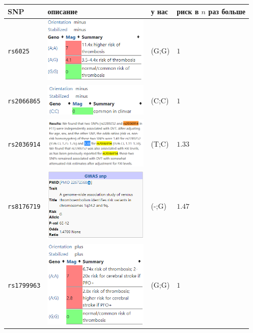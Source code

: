 \documentclass{article}
\begin{document}
  \begin{center}
    \begin{tabular}{|l|l|l|l|}
      \hline
      \textbf{SNP} & \textbf{описание} & \textbf{у нас} & \textbf{риск в $n$ раз больше} \\
      \hline\hline
      \texttt{rs6025} & \includegraphics[width=5cm]{rs6025.png} & (G;G) & $1$ \\\hline
      \texttt{rs2066865} & \includegraphics[width=5cm]{rs2066865.png} & (C;C) & $1$ \\\hline
      \texttt{rs2036914} & \includegraphics[width=5cm]{rs2036914.png} & (T;C) & $1.33$ \\\hline
      \texttt{rs8176719} & \includegraphics[width=5cm]{rs8176719.png} & (-;G) & $1.47$ \\\hline
      \texttt{rs1799963} & \includegraphics[width=5cm]{rs1799963.png} & (G;G) & $1$ \\\hline
    \end{tabular}
  \end{center}
\end{document}
